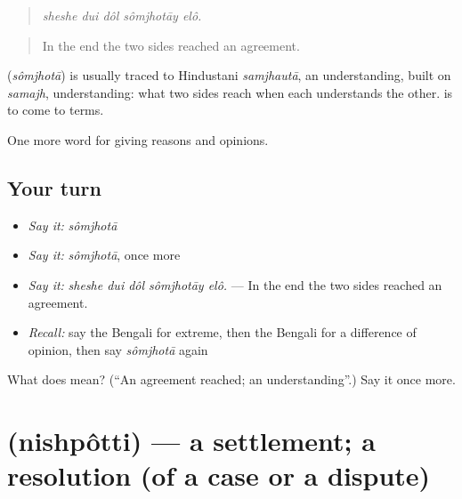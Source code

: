 \begin{quote}
\emph{sheshe dui dôl sômjhotāy elô.}
\end{quote}

\begin{quote}
In the end the two sides reached an agreement.
\end{quote}

\begin{cousinweb}
\textbf{} (\emph{sômjhotā}) is usually traced to Hindustani \emph{samjhautā}, an understanding, built on \emph{samajh}, understanding: what two sides reach when each understands the other.   is to come to terms.
\end{cousinweb}

\begin{grammarlens}[title={What you've built}]
One more word for giving reasons and opinions.
\end{grammarlens}

\subsection*{Your turn}
\begin{itemize}
\raggedright
  \item \emph{Say it:} \emph{sômjhotā}
  \item \emph{Say it:} \emph{sômjhotā}, once more
  \item \emph{Say it:} \emph{sheshe dui dôl sômjhotāy elô.} — In the end the two sides reached an agreement.
  \item \emph{Recall:} say the Bengali for extreme, then the Bengali for a difference of opinion, then say \emph{sômjhotā} again
\end{itemize}

\begin{tcolorbox}[breakable,colback=teal!4,colframe=teal!35!black,title={Before you move on}]
What does  mean? (\textquotedblleft{}An agreement reached; an understanding\textquotedblright{}.) Say it once more.
\end{tcolorbox}
\section[\texorpdfstring{\bn{নিষ্পত্তি} (nishpôtti)}{নিষ্পত্তি (nishpôtti)}]{ (nishpôtti) — a settlement; a resolution (of a case or a dispute)}

\label{lesson:BN-C365-nishpotti}



